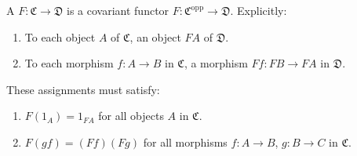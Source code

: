A  $F: \mathfrak{C} \to \mathfrak{D}$ is a covariant functor $F: \mathfrak{C}^{\text{opp}} \to \mathfrak{D}$. Explicitly:
\begin{enumerate}
\item[(i)] To each object $A$ of $\mathfrak{C}$, an object $FA$ of $\mathfrak{D}$.
\item[(ii)] To each morphism $f: A \to B$ in $\mathfrak{C}$, a morphism $Ff: FB \to FA$ in $\mathfrak{D}$.
\end{enumerate}
These assignments must satisfy:
\begin{enumerate}
\item[(a)] $F(1_A) = 1_{FA}$ for all objects $A$ in $\mathfrak{C}$.
\item[(b)] $F(gf) = (Ff)(Fg)$ for all morphisms $f: A \to B$, $g: B \to C$ in $\mathfrak{C}$.
\end{enumerate}
